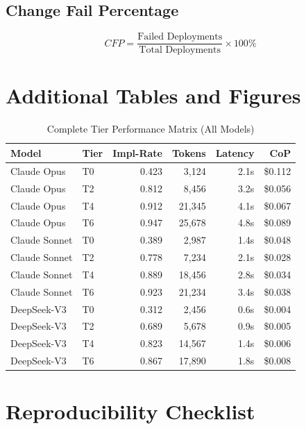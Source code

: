 \documentclass[11pt]{article}
\begin{document}
\subsection{Change Fail Percentage}
\begin{equation}
    CFP = \frac{\text{Failed Deployments}}{\text{Total Deployments}} \times 100\%
\end{equation}

\section{Additional Tables and Figures}

\begin{table}[H]
\centering
\caption{Complete Tier Performance Matrix (All Models)}
\label{tab:full-matrix}
\begin{tabular}{llrrrr}
\toprule
\textbf{Model} & \textbf{Tier} & \textbf{Impl-Rate} & \textbf{Tokens} & \textbf{Latency} & \textbf{CoP} \\
\midrule
Claude Opus & T0 & 0.423 & 3,124 & 2.1s & \$0.112 \\
Claude Opus & T2 & 0.812 & 8,456 & 3.2s & \$0.056 \\
Claude Opus & T4 & 0.912 & 21,345 & 4.1s & \$0.067 \\
Claude Opus & T6 & 0.947 & 25,678 & 4.8s & \$0.089 \\
\midrule
Claude Sonnet & T0 & 0.389 & 2,987 & 1.4s & \$0.048 \\
Claude Sonnet & T2 & 0.778 & 7,234 & 2.1s & \$0.028 \\
Claude Sonnet & T4 & 0.889 & 18,456 & 2.8s & \$0.034 \\
Claude Sonnet & T6 & 0.923 & 21,234 & 3.4s & \$0.038 \\
\midrule
DeepSeek-V3 & T0 & 0.312 & 2,456 & 0.6s & \$0.004 \\
DeepSeek-V3 & T2 & 0.689 & 5,678 & 0.9s & \$0.005 \\
DeepSeek-V3 & T4 & 0.823 & 14,567 & 1.4s & \$0.006 \\
DeepSeek-V3 & T6 & 0.867 & 17,890 & 1.8s & \$0.008 \\
\bottomrule
\end{tabular}
\end{table}


\section{Reproducibility Checklist}
\end{document}
